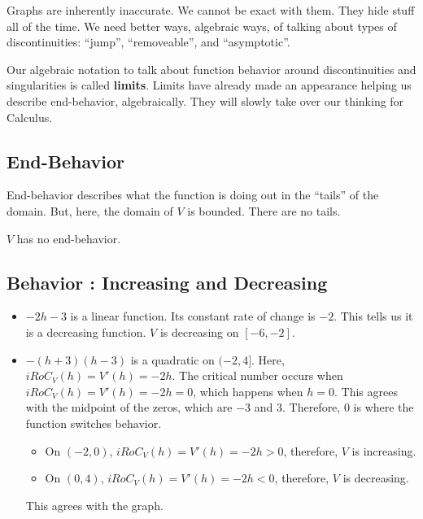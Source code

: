 \documentclass{ximera}
\begin{document}
\begin{notation}


Graphs are inherently inaccurate.  We cannot be exact with them.  They hide stuff all of the time. We need better ways, algebraic ways, of talking about types of discontinuities: ``jump'', ``removeable'', and ``asymptotic''.

Our algebraic notation to talk about function behavior around discontinuities and singularities is called \textbf{\textcolor{purple!85!blue}{limits}}.  Limits have already made an appearance helping us describe end-behavior, algebraically. They will slowly take over our thinking for Calculus.
\end{notation}










\subsection*{End-Behavior} 


End-behavior describes what the function is doing out in the ``tails'' of the domain.  But, here, the domain of $V$ is bounded.  There are no tails. 

$V$ has no end-behavior. 









\subsection*{Behavior : Increasing and Decreasing} 



\begin{itemize}
\item \textbf{$-2h-3$} is a linear function.  Its constant rate of change is $-2$.  This tells us it is a decreasing function.  $V$ is decreasing on $[-6, -2]$.

\item \textbf{$-(h+3)(h-3)$} is a quadratic on $(-2, 4]$. Here, $iRoC_V(h) = V'(h)= -2h$. The critical number occurs when $iRoC_V(h) = V'(h) = -2h = 0$, which happens when $h=0$. This agrees with the midpoint of the zeros, which are $-3$ and $3$.  Therefore, $0$ is where the function switches behavior.  

\begin{itemize}
\item On $(-2, 0)$, $iRoC_V(h) = V'(h) = -2h > 0$, therefore, $V$ is increasing.  
\item On $(0,4)$, $iRoC_V(h) = V'(h) = -2h < 0$, therefore, $V$ is decreasing.
\end{itemize}

This agrees with the graph.

\end{itemize}
\end{document}
